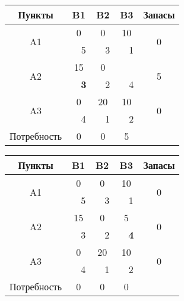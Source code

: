 \documentclass[a4paper,12pt]{article}
\begin{document}
	\begin{center}
		\begin{tabular}{|c|c|c|c|c|c|c|c}
			\hline
			Пункты & \multicolumn{2}{c|}{B1} & \multicolumn{2}{c|}{B2} & \multicolumn{2}{c|}{B3} & \multicolumn{1}{c|}{Запасы} \\ \hline
			\multirow{2}{*}{A1} & \multicolumn{2}{c|}{0} & \multicolumn{2}{c|}{0} & \multicolumn{2}{c|}{10} & \multicolumn{1}{c|}{\multirow{2}{*}{0}} \\ \cline{2-7}
			&  & 5 &  & 3 &  & 1 & \multicolumn{1}{c|}{} \\ \hline
			\multirow{2}{*}{A2} & \multicolumn{2}{c|}{15} & \multicolumn{2}{c|}{0} & \multicolumn{2}{c|}{\textbf{}} & \multicolumn{1}{c|}{\multirow{2}{*}{5}} \\ \cline{2-7}
			&  & \textbf{3} &  & 2 &  & 4 & \multicolumn{1}{c|}{} \\ \hline
			\multirow{2}{*}{A3} & \multicolumn{2}{c|}{0} & \multicolumn{2}{c|}{20} & \multicolumn{2}{c|}{10} & \multicolumn{1}{c|}{\multirow{2}{*}{0}} \\ \cline{2-7}
			&  & 4 &  & 1 &  & 2 & \multicolumn{1}{c|}{} \\ \hline
			Потребность & \multicolumn{2}{c|}{0} & \multicolumn{2}{c|}{0} & \multicolumn{2}{c|}{5} &  \\ \cline{1-7}
		\end{tabular}
		\begin{tabular}{|c|c|c|c|c|c|c|c}
			\hline
			Пункты & \multicolumn{2}{c|}{B1} & \multicolumn{2}{c|}{B2} & \multicolumn{2}{c|}{B3} & \multicolumn{1}{c|}{Запасы} \\ \hline
			\multirow{2}{*}{A1} & \multicolumn{2}{c|}{0} & \multicolumn{2}{c|}{0} & \multicolumn{2}{c|}{10} & \multicolumn{1}{c|}{\multirow{2}{*}{0}} \\ \cline{2-7}
			&  & 5 &  & 3 &  & 1 & \multicolumn{1}{c|}{} \\ \hline
			\multirow{2}{*}{A2} & \multicolumn{2}{c|}{15} & \multicolumn{2}{c|}{0} & \multicolumn{2}{c|}{5} & \multicolumn{1}{c|}{\multirow{2}{*}{0}} \\ \cline{2-7}
			&  & 3 &  & 2 &  & \textbf{4} & \multicolumn{1}{c|}{} \\ \hline
			\multirow{2}{*}{A3} & \multicolumn{2}{c|}{0} & \multicolumn{2}{c|}{20} & \multicolumn{2}{c|}{10} & \multicolumn{1}{c|}{\multirow{2}{*}{0}} \\ \cline{2-7}
			&  & 4 &  & 1 &  & 2 & \multicolumn{1}{c|}{} \\ \hline
			Потребность & \multicolumn{2}{c|}{0} & \multicolumn{2}{c|}{0} & \multicolumn{2}{c|}{0} &  \\ \cline{1-7}
		\end{tabular}
	\end{center}
\end{document}
